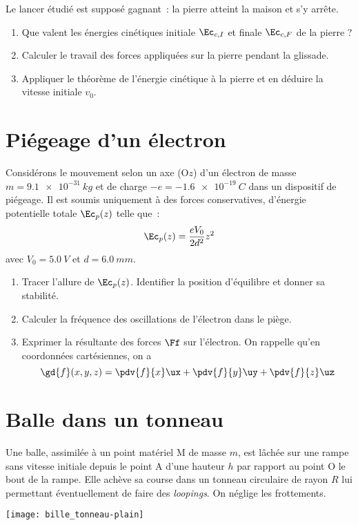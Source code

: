 \documentclass[a4paper, 12pt, final, garamond]{book}
\begin{document}
Le lancer étudié est supposé gagnant~: la pierre atteint la maison et s'y
arrête. \bigbreak

\begin{enumerate}
    \item Que valent les énergies cinétiques initiale $\Ec_{c,I}$ et finale
        $\Ec_{c,F}$ de la pierre ?
    \item Calculer le travail des forces appliquées sur la pierre pendant la
        glissade.
    \item Appliquer le théorème de l'énergie cinétique à la pierre et en déduire
        la vitesse initiale $v_0$.
\end{enumerate}

\section{Piégeage d'un électron}
Considérons le mouvement selon un axe (O$z$) d'un électron de masse $m =
\SI{9.1e-31}{kg}$ et de charge $-e = \SI{-1.6e-19}{C}$ dans un dispositif de
piégeage. Il est soumis uniquement à des forces conservatives, d'énergie
potentielle totale $\Ec_p(z)$ telle que~:
\[\Ec_p(z) = \frac{eV_0}{2d^2}z^2\]
avec $V_0 = \SI{5.0}{V}$ et $d = \SI{6.0}{mm}$. \bigbreak
\begin{enumerate}
    \item Tracer l'allure de $\Ec_p(z)$. Identifier la position d'équilibre et
        donner sa stabilité.
    \item Calculer la fréquence des oscillations de l'électron dans le piège.
    \item Exprimer la résultante des forces $\Ff$ sur l'électron. On rappelle
        qu'en coordonnées cartésiennes, on a
        \[\gd{f}(x,y,z) = \pdv{f}{x}\ux + \pdv{f}{y}\uy + \pdv{f}{z}\uz \]
\end{enumerate}

\section{Balle dans un tonneau}
\begin{minipage}{0.60\linewidth}
    Une balle, assimilée à un point matériel M de masse $m$, est lâchée sur une
    rampe sans vitesse initiale depuis le point A d'une hauteur $h$ par rapport
    au point O le bout de la rampe. Elle achève sa course dans un tonneau
    circulaire de rayon $R$ lui permettant éventuellement de faire des
    \textit{loopings}. On néglige les frottements.
\end{minipage}
\hfill
\begin{minipage}{0.35\linewidth}
    \begin{center}
        \texttt{[image: bille\_tonneau-plain]}
    \end{center}
\end{minipage}
\end{document}
